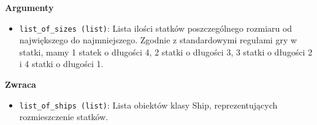 \documentclass[12pt]{article}
\begin{document}
        \textbf{Argumenty}
            \begin{itemize}
                \item \texttt{list\_of\_sizes (list)}: Lista ilości statków poszczególnego rozmiaru od największego do najmniejszego.
                        Zgodnie z standardowymi regułami gry w statki, mamy 1 statek o długości 4, 2 statki o długości 3, 
                        3 statki o długości 2 i 4 statki o długości 1.
            \end{itemize}
        
        \textbf{Zwraca}
            \begin{itemize}
                \item \texttt{list\_of\_ships (list)}: Lista obiektów klasy Ship, reprezentujących rozmieszczenie statków.
            \end{itemize}
        
\end{document}
